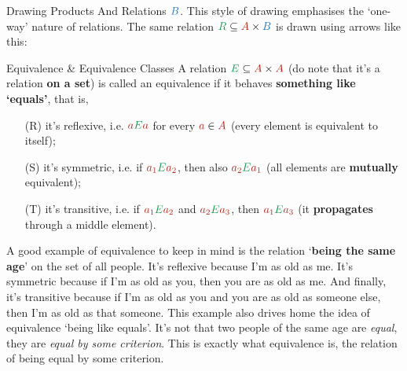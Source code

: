 \documentclass[final]{beamer}
\newlength{\colwidth}
\newcommand{\clr}{\textcolor{BrickRed}}
\newcommand{\clb}{\textcolor{RoyalBlue}}
\newcommand{\clg}{\textcolor{ForestGreen}}
\begin{document}
\begin{frame}[t]
\begin{columns}[t]
\begin{column}{\colwidth}
\begin{block}{Drawing Products And Relations}
 $\clb{B}$. This style of drawing emphasises the `one-way' nature of relations.
 The same relation $\clg{R} \subseteq \clr{A} \times \clb{B}$ is drawn using
 arrows like this:
 \begin{center}
 \end{center}
\end{block}

\begin{exampleblock}{Equivalence \& Equivalence Classes}
 A relation $\clg{E} \subseteq \clr{A} \times \clr{A}$ (do note that it's a
 relation \textbf{on a set}) is called an \alert{equivalence} if it behaves
 \textbf{something like `equals'}, that is,
 \begin{itemize}[left=2em]
  \item[(R)] it's \alert{reflexive}, i.e. $\clr{a}\clg{E}\clr{a}$ for every
   $\clr{a} \in \clr{A}$ (every element is equivalent to itself);
  \item[(S)] it's \alert{symmetric}, i.e. if $\clr{a_1}\clg{E}\clr{a_2}$, then
   also $\clr{a_2}\clg{E}\clr{a_1}$ (all elements are \textbf{mutually}
   equivalent);
  \item[(T)] it's \alert{transitive}, i.e. if $\clr{a_1}\clg{E}\clr{a_2}$ and
   $\clr{a_2} \clg{E} \clr{a_3}$, then $\clr{a_1} \clg{E} \clr{a_3}$ (it
   \textbf{propagates} through a middle element).
 \end{itemize}
 A good example of equivalence to keep in mind is the relation `\textbf{being
 the same age}' on the set of all people. It's \alert{reflexive} because I'm as
 old as me. It's \alert{symmetric} because if I'm as old as you, then you are as
 old as me. And finally, it's \alert{transitive} because if I'm as old as you
 and you are as old as someone else, then I'm as old as that someone. This
 example also drives home the idea of equivalence `being like equals'. It's not
 that two people of the same age are \emph{equal}, they are \emph{equal by some
 criterion}. This is exactly what equivalence is, the relation of being equal by
 some criterion.


\end{exampleblock}
\end{column}
\end{columns}
\end{frame}
\end{document}
